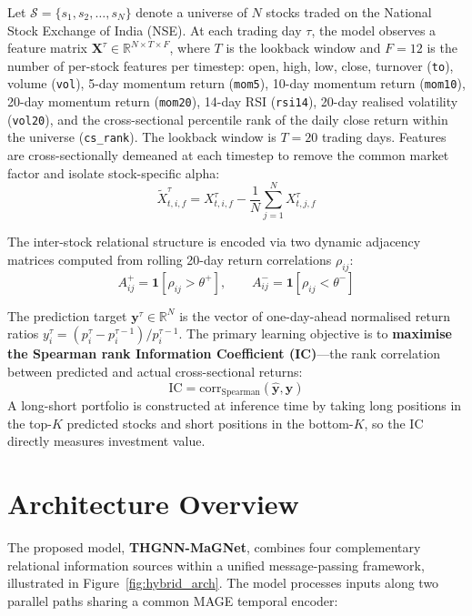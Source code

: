 \documentclass[a4paper,11pt]{report}
\begin{document}
Let $\mathcal{S} = \{s_1, s_2, \ldots, s_N\}$ denote a universe of $N$ stocks traded on the National Stock Exchange of India (NSE). At each trading day $\tau$, the model observes a feature matrix $\mathbf{X}^\tau \in \mathbb{R}^{N \times T \times F}$, where $T$ is the lookback window and $F = 12$ is the number of per-stock features per timestep: open, high, low, close, turnover (\texttt{to}), volume (\texttt{vol}), 5-day momentum return (\texttt{mom5}), 10-day momentum return (\texttt{mom10}), 20-day momentum return (\texttt{mom20}), 14-day RSI (\texttt{rsi14}), 20-day realised volatility (\texttt{vol20}), and the cross-sectional percentile rank of the daily close return within the universe (\texttt{cs\_rank}). The lookback window is $T = 20$ trading days. Features are cross-sectionally demeaned at each timestep to remove the common market factor and isolate stock-specific alpha:
\begin{equation}
\tilde{X}^\tau_{t,i,f} = X^\tau_{t,i,f} - \frac{1}{N}\sum_{j=1}^{N}X^\tau_{t,j,f}
\end{equation}

The inter-stock relational structure is encoded via two dynamic adjacency matrices computed from rolling 20-day return correlations $\rho_{ij}$:
\begin{equation}
A^{+}_{ij} = \mathbf{1}[\rho_{ij} > \theta^{+}], \qquad A^{-}_{ij} = \mathbf{1}[\rho_{ij} < \theta^{-}]
\end{equation}

The prediction target $\mathbf{y}^\tau \in \mathbb{R}^N$ is the vector of one-day-ahead normalised return ratios $y^\tau_i = (p^\tau_i - p^{\tau-1}_i)/p^{\tau-1}_i$. The primary learning objective is to \textbf{maximise the Spearman rank Information Coefficient (IC)}---the rank correlation between predicted and actual cross-sectional returns:
\begin{equation}
\text{IC} = \text{corr}_{\text{Spearman}}(\hat{\mathbf{y}}, \mathbf{y})
\end{equation}
A long-short portfolio is constructed at inference time by taking long positions in the top-$K$ predicted stocks and short positions in the bottom-$K$, so the IC directly measures investment value.

\section{Architecture Overview}
\label{sec:arch_overview}

The proposed model, \textbf{THGNN-MaGNet}, combines four complementary relational information sources within a unified message-passing framework, illustrated in Figure~\ref{fig:hybrid_arch}. The model processes inputs along two parallel paths sharing a common MAGE temporal encoder:
\end{document}
